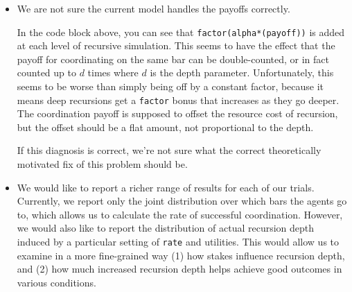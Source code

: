 \begin{itemize}
\item
  We are not sure the current model handles the payoffs correctly.

  In the code block above, you can see that
  \texttt{factor(alpha*(payoff))} is added at each level of recursive
  simulation. This seems to have the effect that the payoff for
  coordinating on the same bar can be double-counted, or in fact counted
  up to \(d\) times where \(d\) is the depth parameter. Unfortunately,
  this seems to be worse than simply being off by a constant factor,
  because it means deep recursions get a \texttt{factor} bonus that
  increases as they go deeper. The coordination payoff is supposed to
  offset the resource cost of recursion, but the offset should be a flat
  amount, not proportional to the depth.

  If this diagnosis is correct, we're not sure what the correct
  theoretically motivated fix of this problem should be.
\item
  We would like to report a richer range of results for each of our
  trials. Currently, we report only the joint distribution over which
  bars the agents go to, which allows us to calculate the rate of
  successful coordination. However, we would also like to report the
  distribution of actual recursion depth induced by a particular setting
  of \texttt{rate} and utilities. This would allow us to examine in a
  more fine-grained way (1) how stakes influence recursion depth, and
  (2) how much increased recursion depth helps achieve good outcomes in
  various conditions.
\end{itemize}
